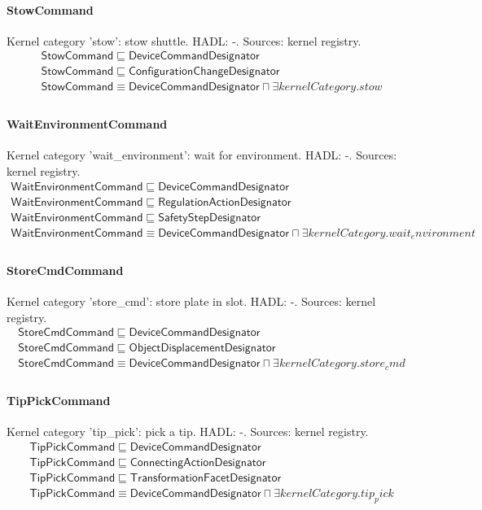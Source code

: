 \documentclass[10pt]{article}
\begin{document}
\paragraph{StowCommand} Kernel category 'stow': stow shuttle. HADL: -. Sources: kernel registry.
\[\begin{array}{l}
\mathsf{StowCommand} \sqsubseteq  \mathsf{DeviceCommandDesignator} \\
\mathsf{StowCommand} \sqsubseteq  \mathsf{ConfigurationChangeDesignator} \\
\mathsf{StowCommand} \equiv  \mathsf{DeviceCommandDesignator} \sqcap  \exists \mathit{kernelCategory}.{stow} \\
\end{array}\]
\paragraph{WaitEnvironmentCommand} Kernel category 'wait\_environment': wait for environment. HADL: -. Sources: kernel registry.
\[\begin{array}{l}
\mathsf{WaitEnvironmentCommand} \sqsubseteq  \mathsf{DeviceCommandDesignator} \\
\mathsf{WaitEnvironmentCommand} \sqsubseteq  \mathsf{RegulationActionDesignator} \\
\mathsf{WaitEnvironmentCommand} \sqsubseteq  \mathsf{SafetyStepDesignator} \\
\mathsf{WaitEnvironmentCommand} \equiv  \mathsf{DeviceCommandDesignator} \sqcap  \exists \mathit{kernelCategory}.{wait_environment} \\
\end{array}\]
\paragraph{StoreCmdCommand} Kernel category 'store\_cmd': store plate in slot. HADL: -. Sources: kernel registry.
\[\begin{array}{l}
\mathsf{StoreCmdCommand} \sqsubseteq  \mathsf{DeviceCommandDesignator} \\
\mathsf{StoreCmdCommand} \sqsubseteq  \mathsf{ObjectDisplacementDesignator} \\
\mathsf{StoreCmdCommand} \equiv  \mathsf{DeviceCommandDesignator} \sqcap  \exists \mathit{kernelCategory}.{store_cmd} \\
\end{array}\]
\paragraph{TipPickCommand} Kernel category 'tip\_pick': pick a tip. HADL: -. Sources: kernel registry.
\[\begin{array}{l}
\mathsf{TipPickCommand} \sqsubseteq  \mathsf{DeviceCommandDesignator} \\
\mathsf{TipPickCommand} \sqsubseteq  \mathsf{ConnectingActionDesignator} \\
\mathsf{TipPickCommand} \sqsubseteq  \mathsf{TransformationFacetDesignator} \\
\mathsf{TipPickCommand} \equiv  \mathsf{DeviceCommandDesignator} \sqcap  \exists \mathit{kernelCategory}.{tip_pick} \\
\end{array}\]
\end{document}
